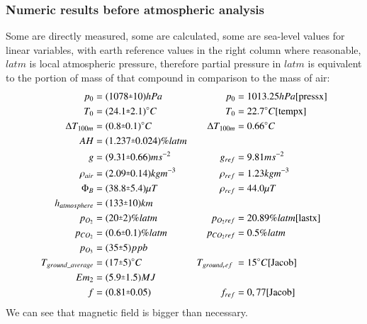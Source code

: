\documentclass{cfp}
\newcommand{\rpm}{\sbox0{$1$}\sbox2{$\scriptstyle\pm$}
  \raise\dimexpr(\ht0-\ht2)/2\relax\box2 }
\newcommand{\degree}{^{\circ}}
\begin{document}
\subsubsection{Numeric results before atmospheric analysis}
Some are directly measured, some are calculated, some are sea-level values for linear variables, with earth reference values in the right column where reasonable, $latm$ is local atmospheric pressure, therefore partial pressure in $latm$ is equivalent to the portion of mass of that compound in comparison to the mass of air:\\
\begin{align}
p_0 &= (1078\rpm10)hPa & p_0 &= 1013.25hPa \cite{pressx}\\
T_0 &= (24.1\rpm2.1)\degree C & T_0 &= 22.7\degree C \cite{tempx}\\
\Delta T_{100m} &= (0.8\rpm0.1)\degree C & \Delta T_{100m} &= 0.66\degree C\\
AH &= (1.237\rpm0.024)\% latm & & \\
g &= (9.31\rpm0.66)ms^{-2} & g_{ref} &= 9.81ms^{-2}\\
\rho_{air} &= (2.09\rpm0.14)kgm^{-3} & \rho_{ref} &= 1.23kgm^{-3}\\
\Phi_B &= (38.8\rpm5.4)\mu T & \rho_{ref} &= 44.0\mu T\\
h_{atmosphere} &= (133 \rpm 10) km & &\\
p_{O_2} &= (20\rpm2) \% latm & p_{O_2ref} &= 20.89 \% latm \cite{lastx}\\
p_{CO_2} &= (0.6\rpm0.1) \% latm & p_{CO_2ref} &= 0.5 \% latm\\
p_{O_3} &= (35\rpm 5) ppb & & \\
T_{ground\_average} &= (17\rpm5)\degree C &  T_{ground_ref}\ &= 15 \degree C \cite{Jacob}\\
Em_{2} &= (5.9\rpm1.5) MJ & & \\
f &= (0.81\rpm0.05) & f_{ref} &= 0,77\cite{Jacob}
\end{align}
We can see that magnetic field is bigger than necessary.
\end{document}
